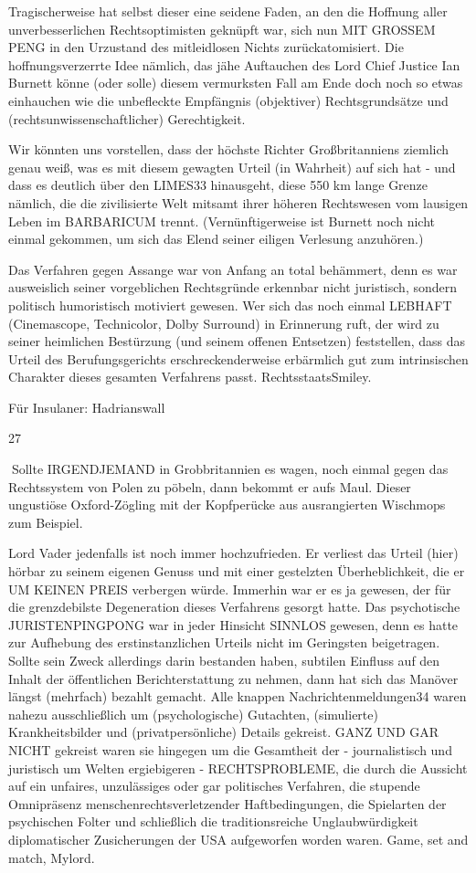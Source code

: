 \begin{multicols}{2}
Tragischerweise hat selbst dieser eine seidene Faden,
an den die Hoffnung aller unverbesserlichen Rechtsoptimisten geknüpft war, sich nun MIT GROSSEM PENG
in den Urzustand des mitleidlosen Nichts zurückatomisiert. Die hoffnungsverzerrte Idee nämlich, das jähe Auftauchen des Lord Chief Justice Ian Burnett könne (oder
solle) diesem vermurksten Fall am Ende doch noch so
etwas einhauchen wie die unbefleckte Empfängnis (objektiver) Rechtsgrundsätze und (rechtsunwissenschaftlicher) Gerechtigkeit.

Wir könnten uns vorstellen, dass der höchste Richter
Großbritanniens ziemlich genau weiß, was es mit diesem gewagten Urteil (in Wahrheit) auf sich hat - und
dass es deutlich über den LIMES33 hinausgeht, diese 550
km lange Grenze nämlich, die die zivilisierte Welt mitsamt ihrer höheren Rechtswesen vom lausigen Leben
im BARBARICUM trennt. (Vernünftigerweise ist Burnett
noch nicht einmal gekommen, um sich das Elend seiner
eiligen Verlesung anzuhören.)

Das Verfahren gegen Assange war von Anfang an total
behämmert, denn es war ausweislich seiner vorgeblichen Rechtsgründe erkennbar nicht juristisch, sondern
politisch humoristisch motiviert gewesen. Wer sich das
noch einmal LEBHAFT (Cinemascope, Technicolor,
Dolby Surround) in Erinnerung ruft, der wird zu seiner
heimlichen Bestürzung (und seinem offenen Entsetzen) feststellen, dass das Urteil des Berufungsgerichts
erschreckenderweise erbärmlich gut zum intrinsischen
Charakter dieses gesamten Verfahrens passt. RechtsstaatsSmiley.

Für Insulaner: Hadrianswall %

27

Sollte IRGENDJEMAND in Grobbritannien es wagen,
noch einmal gegen das Rechtssystem von Polen zu pöbeln, dann bekommt er aufs Maul. Dieser ungustiöse
Oxford-Zögling mit der Kopfperücke aus ausrangierten
Wischmops zum Beispiel.

Lord Vader jedenfalls ist noch immer hochzufrieden. Er
verliest das Urteil (hier) hörbar zu seinem eigenen Genuss und mit einer gestelzten Überheblichkeit, die er
UM KEINEN PREIS verbergen würde. Immerhin war er
es ja gewesen, der für die grenzdebilste Degeneration
dieses Verfahrens gesorgt hatte. Das psychotische JURISTENPINGPONG war in jeder Hinsicht SINNLOS gewesen, denn es hatte zur Aufhebung des erstinstanzlichen Urteils nicht im Geringsten beigetragen. Sollte sein
Zweck allerdings darin bestanden haben, subtilen Einfluss auf den Inhalt der öffentlichen Berichterstattung
zu nehmen, dann hat sich das Manöver längst (mehrfach) bezahlt gemacht. Alle knappen Nachrichtenmeldungen34 waren nahezu ausschließlich um (psychologische) Gutachten, (simulierte) Krankheitsbilder und
(privatpersönliche) Details gekreist. GANZ UND GAR
NICHT gekreist waren sie hingegen um die Gesamtheit
der - journalistisch und juristisch um Welten ergiebigeren - RECHTSPROBLEME, die durch die Aussicht auf ein
unfaires, unzulässiges oder gar politisches Verfahren, die
stupende Omnipräsenz menschenrechtsverletzender
Haftbedingungen, die Spielarten der psychischen Folter
und schließlich die traditionsreiche Unglaubwürdigkeit
diplomatischer Zusicherungen der USA aufgeworfen
worden waren. Game, set and match, Mylord.


\end{multicols}
